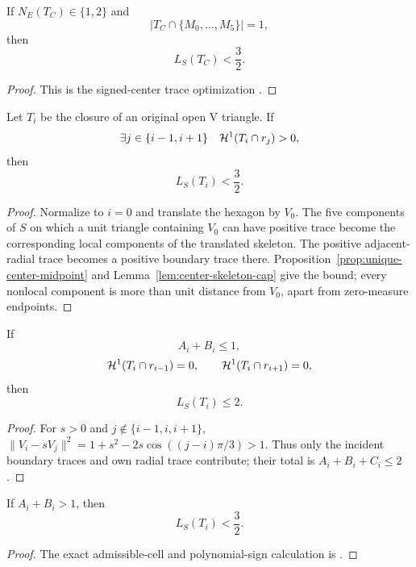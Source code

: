 \begin{lemma}
\label{lem:center-skeleton-cap}
If $N_E(T_C)\in\{1,2\}$ and
\[
 \left|T_C\cap\{M_0,\ldots,M_5\}\right|=1,
\]
then
\[
 L_S(T_C)<\frac32.
\]
\end{lemma}

\begin{proof}
This is the signed-center trace optimization
.
\end{proof}

\begin{lemma}
\label{lem:positive-support-skeleton-cap}
Let $T_i$ be the closure of an original open V triangle.  If
\[
 \exists j\in\{i-1,i+1\}\quad\mathcal H^1(T_i\cap r_j)>0,
\]
then
\[
 L_S(T_i)<\frac32.
\]
\end{lemma}

\begin{proof}
Normalize to $i=0$ and translate the hexagon by $V_0$.  The five components
of $S$ on which a unit triangle containing $V_0$ can have positive trace
become the corresponding local components of the translated skeleton.  The
positive adjacent-radial trace becomes a positive boundary trace there.
Proposition~\ref{prop:unique-center-midpoint} and
Lemma~\ref{lem:center-skeleton-cap} give the bound; every nonlocal component
is more than unit distance from $V_0$, apart from zero-measure endpoints.
\end{proof}

\begin{lemma}
\label{lem:no-support-skeleton-cap}
If
\[
 A_i+B_i\le1,
\]
\[
 \mathcal H^1(T_i\cap r_{i-1})=0,
 \qquad \mathcal H^1(T_i\cap r_{i+1})=0,
\]
then
\[
 L_S(T_i)\le2.
\]
\end{lemma}

\begin{proof}
For $s>0$ and $j\notin\{i-1,i,i+1\}$,
$\|V_i-sV_j\|^2=1+s^2-2s\cos((j-i)\pi/3)>1$.
Thus only the incident boundary traces and own radial trace contribute;
their total is $A_i+B_i+C_i\le2$.
\end{proof}

\begin{lemma}
\label{lem:supercritical-skeleton-cap}
If $A_i+B_i>1$, then
\[
 L_S(T_i)<\frac32.
\]
\end{lemma}

\begin{proof}
The exact admissible-cell and polynomial-sign calculation is
.
\end{proof}

